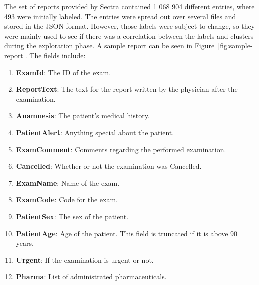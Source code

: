 The set of reports provided by Sectra contained 1 068 904 different entries, where 493 were initially labeled.
The entries were spread out over several files and stored in the JSON format.
However, those labels were subject to change, so they were mainly used to see if there was a correlation between the labels and clusters during the exploration phase.
A sample report can be seen in Figure~\ref{fig:sample-report}.
The fields include:
\begin{enumerate}
    \item \textbf{ExamId}: The ID of the exam.
    \item \textbf{ReportText}: The text for the report written by the physician after the examination.
    \item \textbf{Anamnesis}: The patient's medical history.
    \item \textbf{PatientAlert}: Anything special about the patient.
    \item \textbf{ExamComment}: Comments regarding the performed examination.
    \item \textbf{Cancelled}: Whether or not the examination was Cancelled.
    \item \textbf{ExamName}: Name of the exam.
    \item \textbf{ExamCode}: Code for the exam.
    \item \textbf{PatientSex}: The sex of the patient.
    \item \textbf{PatientAge}: Age of the patient. This field is truncated if it is above 90 years.
    \item \textbf{Urgent}: If the examination is urgent or not.
    \item \textbf{Pharma}: List of administrated pharmaceuticals.
\end{enumerate}
